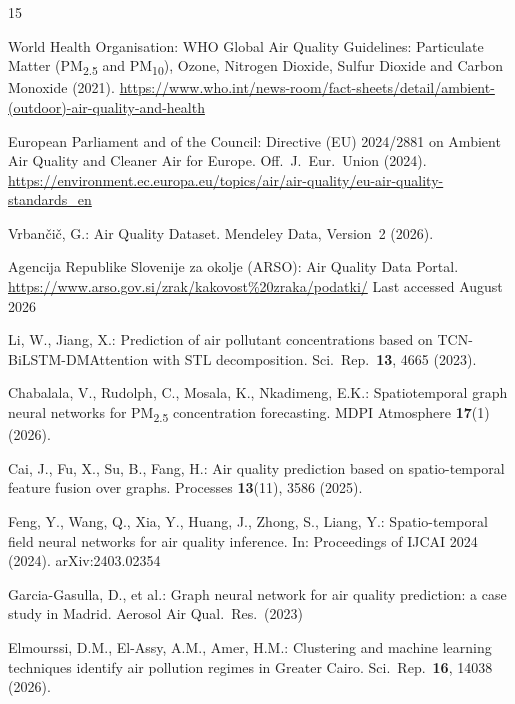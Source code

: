 \documentclass[runningheads]{llncs}
\begin{document}
\begin{thebibliography}{15}

World Health Organisation: WHO Global Air Quality Guidelines: Particulate
Matter (PM\textsubscript{2.5} and PM\textsubscript{10}), Ozone,
Nitrogen Dioxide, Sulfur Dioxide and Carbon Monoxide (2021).
\url{https://www.who.int/news-room/fact-sheets/detail/ambient-(outdoor)-air-quality-and-health}

European Parliament and of the Council: Directive (EU) 2024/2881 on
Ambient Air Quality and Cleaner Air for Europe. Off.\ J.\ Eur.\ Union
(2024). \url{https://environment.ec.europa.eu/topics/air/air-quality/eu-air-quality-standards_en}

Vrban{\v{c}}i{\v{c}}, G.: Air Quality Dataset. Mendeley Data,
Version~2 (2026). 

Agencija Republike Slovenije za okolje (ARSO): Air Quality Data Portal.
\url{https://www.arso.gov.si/zrak/kakovost\%20zraka/podatki/}
Last accessed August 2026

Li, W., Jiang, X.: Prediction of air pollutant concentrations based on
TCN-BiLSTM-DMAttention with STL decomposition.
Sci.\ Rep.\ \textbf{13}, 4665 (2023). 

Chabalala, V., Rudolph, C., Mosala, K., Nkadimeng, E.K.:
Spatiotemporal graph neural networks for PM\textsubscript{2.5}
concentration forecasting. MDPI Atmosphere \textbf{17}(1) (2026).

Cai, J., Fu, X., Su, B., Fang, H.: Air quality prediction based on
spatio-temporal feature fusion over graphs. Processes \textbf{13}(11),
3586 (2025). 

Feng, Y., Wang, Q., Xia, Y., Huang, J., Zhong, S., Liang, Y.:
Spatio-temporal field neural networks for air quality inference.
In: Proceedings of IJCAI 2024 (2024). arXiv:2403.02354

Garcia-Gasulla, D., et al.: Graph neural network for air quality
prediction: a case study in Madrid. Aerosol Air Qual.\ Res.\ (2023)

Elmourssi, D.M., El-Assy, A.M., Amer, H.M.: Clustering and machine
learning techniques identify air pollution regimes in Greater Cairo.
Sci.\ Rep.\ \textbf{16}, 14038 (2026). 


\end{thebibliography}
\end{document}
